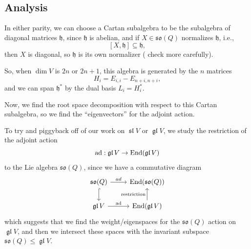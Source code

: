 \documentclass[12pt]{article}
\newcommand{\fh}{\mathfrak{h}}
\newcommand{\gl}{\operatorname{\mathfrak{gl}}}
\DeclareMathOperator{\ad}{ad}
\newcommand{\so}{\mathfrak{so}}
\newcommand{\fsl}{\operatorname{\mathfrak{sl}}}
\begin{document}
\subsection{Analysis}

In either parity, we can choose a Cartan subalgebra to be the subalgebra of diagonal matrices $\fh$, since $\fh$ is abelian, and if $X\in \so(Q)$ normalizes $\fh$, i.e.,
\[[X,\fh] \subseteq \fh,\]
then $X$ is diagonal, so $\fh$ is its own normalizer ({\color{red} check more carefully}).

So, when $\dim V$ is $2n$ or $2n+1$, this algebra is generated by the $n$ matrices
\[H_i = E_{i,i} - E_{n+i,n+i},\]
and we can span $\fh^*$ by the dual basis $L_i = H_i^*$.

Now, we find the root space decomposition with respect to this Cartan subalgebra, so we find the ``eigenvectors'' for the adjoint action.

To try and piggyback off of our work on $\fsl V$ or $\gl V$, we study the restriction of the adjoint action
\[\ad: \gl V \to \End(\gl V)\]
to the Lie algebra $\so(Q)$, since we have a commutative diagram
\[\begin{tikzcd}
    \so(Q) \dar[hook] \rar["ad"] & \End(\so(Q))\\
    \gl V \rar["\ad"] & \End(\gl V) \uar["\text{restriction}"]
\end{tikzcd}\]
which suggests that we find the weight/eigenspaces for the $\so(Q)$ action on $\gl V$, and then we intersect these spaces with the invariant subspace $\so(Q)\leq \gl V$.
\end{document}
